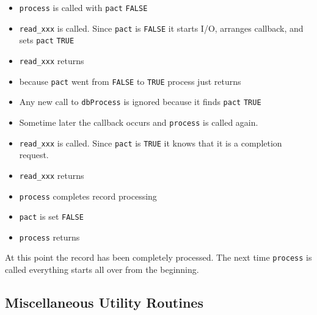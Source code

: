 \begin{itemize}
\item \verb|process| is called with \verb|pact| \verb|FALSE|

\item \verb|read_xxx| is called.
Since \verb|pact| is \verb|FALSE| it starts I/O, arranges callback, and sets \verb|pact| \verb|TRUE|

\item \verb|read_xxx| returns

\item because \verb|pact| went from \verb|FALSE| to \verb|TRUE| process just returns

\item Any new call to \verb|dbProcess| is ignored because it finds \verb|pact| \verb|TRUE|

\item Sometime later the callback occurs and \verb|process| is called again.

\item \verb|read_xxx| is called.
Since \verb|pact| is \verb|TRUE| it knows that it is a completion request.

\item \verb|read_xxx| returns

\item \verb|process| completes record processing

\item \verb|pact| is set \verb|FALSE|

\item \verb|process| returns

\end{itemize}

At this point the record has been completely processed.
The next time \verb|process| is called everything starts all over from the beginning.

\subsection{Miscellaneous Utility Routines}

